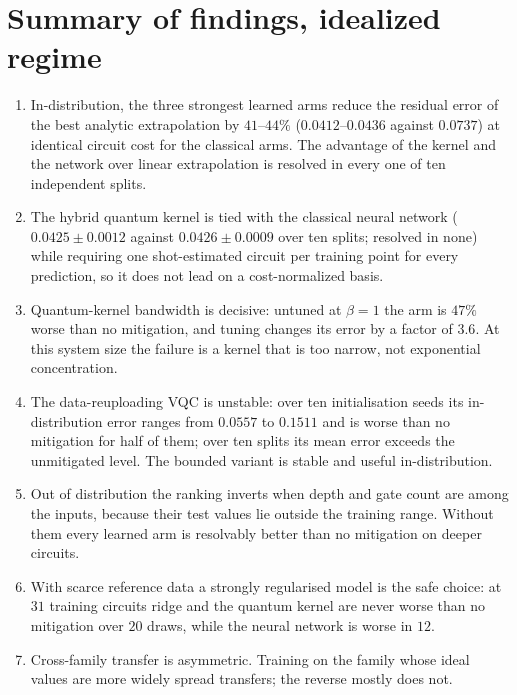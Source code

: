 \documentclass[Thesis.tex]{subfiles}
\begin{document}
\section{Summary of findings, idealized regime}\label{sec:ch5_summary}

\begin{enumerate}
    \item In-distribution, the three strongest learned arms reduce the residual error
    of the best analytic extrapolation by $41$--$44\%$ ($0.0412$--$0.0436$ against
    $0.0737$) at identical circuit cost for the classical arms. The advantage of the
    kernel and the network over linear extrapolation is resolved in every one of ten
    independent splits.

    \item The hybrid quantum kernel is tied with the classical neural network
    ($0.0425 \pm 0.0012$ against $0.0426 \pm 0.0009$ over ten splits; resolved in
    none) while requiring one shot-estimated circuit per training point for every
    prediction, so it does not lead on a cost-normalized basis.

    \item Quantum-kernel bandwidth is decisive: untuned at $\beta = 1$ the arm is
    $47\%$ worse than no mitigation, and tuning changes its error by a factor of
    $3.6$. At this system size the failure is a kernel that is too narrow, not
    exponential concentration.

    \item The data-reuploading VQC is unstable: over ten initialisation seeds its
    in-distribution error ranges from $0.0557$ to $0.1511$ and is worse than no
    mitigation for half of them; over ten splits its mean error exceeds the
    unmitigated level. The bounded variant is stable and useful in-distribution.

    \item Out of distribution the ranking inverts when depth and gate count are among
    the inputs, because their test values lie outside the training range. Without
    them every learned arm is resolvably better than no mitigation on deeper
    circuits.

    \item With scarce reference data a strongly regularised model is the safe choice:
    at $31$ training circuits ridge and the quantum kernel are never worse than no
    mitigation over $20$ draws, while the neural network is worse in $12$.

    \item Cross-family transfer is asymmetric. Training on the family whose ideal
    values are more widely spread transfers; the reverse mostly does not.
\end{enumerate}
\end{document}
